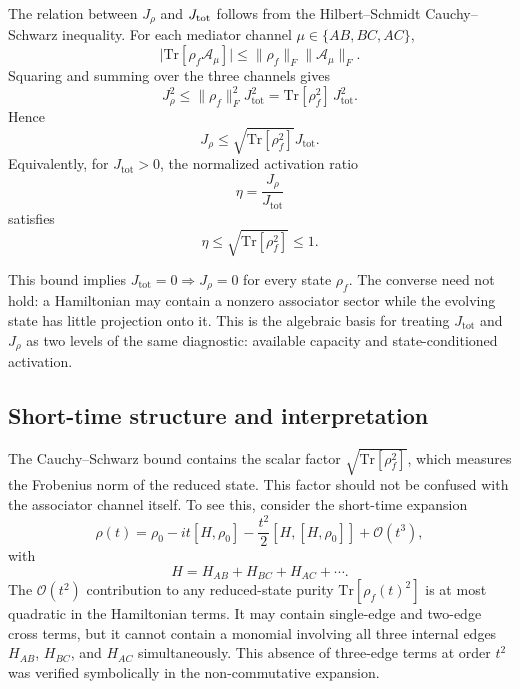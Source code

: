 \documentclass[aps,physrev,preprint,groupedaddress]{revtex4-2}
\begin{document}
The relation between \(J_{\rho}\) and \(J_{\rm tot}\) follows from the
Hilbert--Schmidt Cauchy--Schwarz inequality. For each mediator channel
\(\mu\in\{AB,BC,AC\}\),
\begin{equation}
    \lvert{\mathrm{Tr}}[\rho_f\mathcal{A}_\mu]\rvert \leq
    \lVert\rho_f\rVert_F\lVert\mathcal{A}_\mu\rVert_F.
\end{equation}
Squaring and summing over the three channels gives
\begin{equation}
    J_\rho^2\leq\|\rho_f\|_F^2 J_{\mathrm{tot}}^2 = {\mathrm{Tr}}[\rho_f^2]\,J_{\mathrm{tot}}^2 .
\end{equation}
Hence
\begin{equation}\label{eq:Jrho_Jtot_bound}
    J_\rho\leq\sqrt{{\mathrm{Tr}}[\rho_f^2]}J_{\mathrm{tot}}.
\end{equation}
Equivalently, for $J_{\mathrm{tot}}>0$, the normalized activation ratio
\begin{equation}
    \eta=\frac{J_\rho}{J_{\mathrm{tot}}}
\end{equation}
satisfies
\begin{equation}\label{eq:eta_bound}
    \eta\leq\sqrt{{\mathrm{Tr}}[\rho_f^2]} \leq 1 .
\end{equation}

This bound implies $J_{\mathrm{tot}}=0\Rightarrow J_\rho=0$ for every state $\rho_f$. The converse need not hold: a Hamiltonian may contain a nonzero associator sector while the evolving state has little projection onto it. This is the algebraic basis for treating $J_{\mathrm{tot}}$ and $J_\rho$ as two levels of the same diagnostic: available capacity and state-conditioned activation.

\subsection{Short-time structure and interpretation}\label{sm:algebra-short-time}
The Cauchy--Schwarz bound contains the scalar factor $\sqrt{{\mathrm{Tr}}[\rho_f^2]}$, which measures the Frobenius norm of the reduced state. This factor should not be confused with the
associator channel itself. To see this, consider the short-time expansion
\begin{equation}
    \rho(t)=\rho_0-it[H,\rho_0] - \frac{t^2}{2}[H,[H,\rho_0]] + \mathcal{O}(t^3),
\end{equation}
with
\begin{equation}
     H=H_{AB}+H_{BC}+H_{AC}+\cdots .
\end{equation}
The \(\mathcal{O}(t^2)\) contribution to any reduced-state purity \({\mathrm{Tr}}[\rho_f(t)^2]\) is at most quadratic in the Hamiltonian terms. It may contain single-edge and two-edge cross terms, but it cannot contain a monomial involving all three internal edges $H_{AB}$, $H_{BC}$, and $H_{AC}$ simultaneously. This absence of three-edge terms at order $t^2$ was verified symbolically in the non-commutative expansion.
\end{document}
